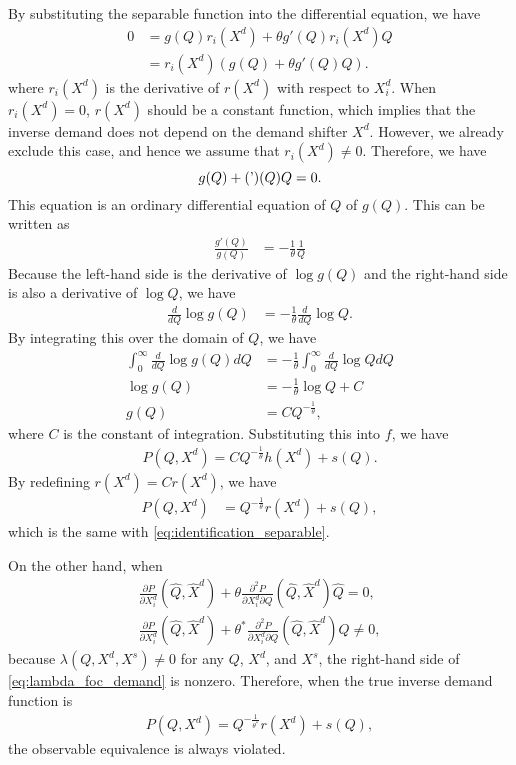 \documentclass[11pt, a4paper]{article}
\theoremstyle{remark}
\begin{document}
By substituting the separable function into the differential equation, we have 
\begin{align}
   0 & =  g(Q) r_i(X^{d}) + \theta g'(Q)r_i(X^{d}) Q\\
   & = r_i(X^{d})( g(Q) + \theta g'(Q)Q).
\end{align}
where $r_i(X^{d})$ is the derivative of $r(X^{d})$ with respect to $X^{d}_i$.
When $r_i(X^{d}) = 0$, $r(X^{d})$ should be a constant function, which implies that the inverse demand does not depend on the demand shifter $X^{d}$.
However, we already exclude this case, and hence we assume that $r_i(X^{d}) \ne 0$.
Therefore, we have 
\[g(Q) + \thetag'(Q)Q = 0.\]
This equation is an ordinary differential equation of $Q$ of $g(Q)$.
This can be written as
\begin{align}
    \frac{g'(Q)}{g(Q)} &= -\frac{1}{\theta} \frac{1}{Q}
\end{align}
Because the left-hand side is the derivative of $\log g(Q)$ and the right-hand side is also a derivative of $\log Q$, we have
\begin{align}
        \frac{d}{dQ} \log g(Q) &= -\frac{1}{\theta} \frac{d}{dQ} \log Q.
\end{align}
By integrating this over the domain of $Q$, we have
\begin{align}
    \int_{0}^\infty \frac{d}{dQ} \log g(Q) dQ &= -\frac{1}{\theta} \int_{0}^\infty  \frac{d}{dQ} \log Q dQ \\
    \log g(Q) &= -\frac{1}{\theta} \log Q + C\\
    g(Q) &= C Q^{-\frac{1}{\theta}},
\end{align}
where $C$ is the constant of integration.
Substituting this into $f$, we have 
\begin{align}
    P(Q, X^{d}) = C Q^{-\frac{1}{\theta}} h(X^{d}) + s(Q).
\end{align}
By redefining $r(X^{d}) = Cr(X^{d})$, we have
\begin{align}
    P(Q, X^{d}) &= Q^{-\frac{1}{\theta}} r(X^{d}) + s(Q),
\end{align}
which is the same with \eqref{eq:identification_separable}.




On the other hand, when
\begin{align}
    \frac{\partial P}{\partial X^{d}_i}(\hat{Q}, \hat{X}^{d}) + \theta\frac{\partial^2 P}{\partial X^{d}_{i}\partial Q}(\hat{Q}, \hat{X}^{d})\hat{Q}  =  0,\\
    \frac{\partial P}{\partial X^{d}_i}(\hat{Q}, \hat{X}^{d}) + \theta^{*}\frac{\partial^2 P}{\partial X^{d}_{i}\partial Q}(\hat{Q}, \hat{X}^{d})\hat{Q}  \ne 0,
\end{align}
because $\lambda(Q, X^{d}, X^{s}) \ne 0$ for any $Q$, $X^{d}$, and $X^{s}$, the right-hand side of \eqref{eq:lambda_foc_demand} is nonzero.
Therefore, when the true inverse demand function is
\begin{align}
    P(Q, X^{d}) = Q^{-\frac{1}{\theta^{*}}} r(X^{d}) + s(Q),
\end{align}
the observable equivalence is always violated.
\end{document}
